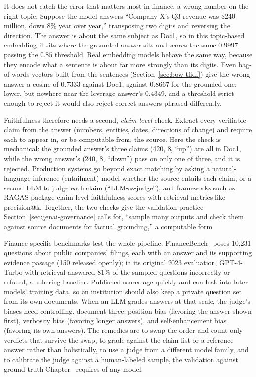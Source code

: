 \documentclass[../ai_in_finance]{subfiles}
\begin{document}
It does not catch the error that matters most in finance, a wrong number on the right topic. Suppose the model answers ``Company X's Q3 revenue was \$240 million, down 8\% year over year,'' transposing two digits and reversing the direction. The answer is about the same subject as Doc1, so in this topic-based embedding it sits where the grounded answer sits and scores the same $0.9997$, passing the $0.85$ threshold. Real embedding models behave the same way, because they encode what a sentence is about far more strongly than its digits. Even bag-of-words vectors built from the sentences (Section~\ref{sec:bow-tfidf}) give the wrong answer a cosine of $0.7333$ against Doc1, against $0.8667$ for the grounded one: lower, but nowhere near the leverage answer's $0.4349$, and a threshold strict enough to reject it would also reject correct answers phrased differently.

Faithfulness therefore needs a second, \emph{claim-level} check. Extract every verifiable claim from the answer (numbers, entities, dates, directions of change) and require each to appear in, or be computable from, the source. Here the check is mechanical: the grounded answer's three claims (420, 8, ``up'') are all in Doc1, while the wrong answer's (240, 8, ``down'') pass on only one of three, and it is rejected. Production systems go beyond exact matching by asking a natural-language-inference (entailment) model whether the source entails each claim, or a second LLM to judge each claim (``LLM-as-judge''), and frameworks such as RAGAS package claim-level faithfulness scores with retrieval metrics like precision@k. Together, the two checks give the validation practice Section~\ref{sec:genai-governance} calls for, ``sample many outputs and check them against source documents for factual grounding,'' a computable form.

Finance-specific benchmarks test the whole pipeline. FinanceBench~\parencite{islam2023financebench} poses 10,231 questions about public companies' filings, each with an answer and its supporting evidence passage (150 released openly); in its original 2023 evaluation, GPT-4-Turbo with retrieval answered 81\% of the sampled questions incorrectly or refused, a sobering baseline. Published scores age quickly and can leak into later models' training data, so an institution should also keep a private question set from its own documents. When an LLM grades answers at that scale, the judge's biases need controlling. \textcite{zheng2023judging} document three: position bias (favoring the answer shown first), verbosity bias (favoring longer answers), and self-enhancement bias (favoring its own answers). The remedies are to swap the order and count only verdicts that survive the swap, to grade against the claim list or a reference answer rather than holistically, to use a judge from a different model family, and to calibrate the judge against a human-labeled sample, the validation against ground truth Chapter~ requires of any model.
\end{document}
